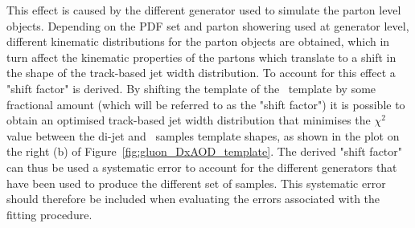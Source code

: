 	This effect is caused by the different generator used to simulate the parton level objects. Depending on the \ac{PDF} set and parton showering used at generator level, different kinematic distributions for the parton objects are obtained, which in turn affect the kinematic properties of the partons which translate to a shift in the shape of the track-based jet width distribution. 
	To account for this effect a "shift factor" is derived. 
	By shifting the template of the \Zjets\ template by some fractional amount (which will be referred to as the "shift factor") it is possible to obtain an optimised track-based jet width distribution that minimises the $\chi^2$ value between the di-jet and \Zjets\ samples template shapes, as shown in the plot on the right (b) of Figure~\ref{fig:gluon_DxAOD_template}. 
	The derived "shift factor" can thus be used a systematic error to account for the different generators that have been used to produce the different set of samples. 
	This systematic error should therefore be included when evaluating the errors associated with the fitting procedure. 

